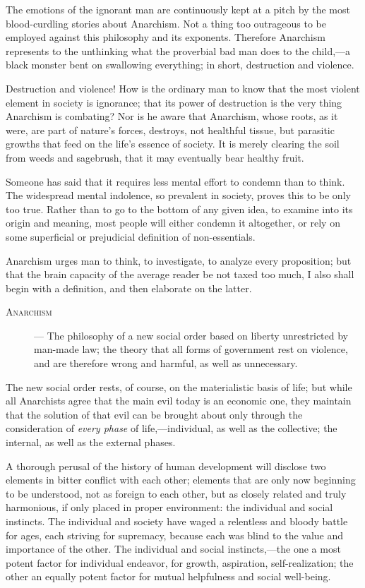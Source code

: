 The emotions of the ignorant man are continuously kept at a pitch by
the most blood-curdling stories about Anarchism. Not a thing too
outrageous to be employed against this philosophy and its exponents.
Therefore Anarchism represents to the unthinking what the proverbial
bad man does to the child,---a black monster bent on swallowing
everything; in short, destruction and violence.

Destruction and violence! How is the ordinary man to know that the
most violent element in society  is ignorance; that its power
of destruction is the very thing Anarchism is combating? Nor is he
aware that Anarchism, whose roots, as it were, are part of nature's
forces, destroys, not healthful tissue, but parasitic growths that
feed on the life's essence of society. It is merely clearing the soil
from weeds and sagebrush, that it may eventually bear healthy fruit.

Someone has said that it requires less mental effort to condemn than
to think. The widespread mental indolence, so prevalent in society,
proves this to be only too true. Rather than to go to the bottom of
any given idea, to examine into its origin and meaning, most people
will either condemn it altogether, or rely on some superficial or
prejudicial definition of non-essentials.

Anarchism urges man to think, to investigate, to analyze every
proposition; but that the brain capacity of the average reader be not
taxed too much, I also shall begin with a definition, and then
elaborate on the latter.

\begin{description}

\item[\textsc{Anarchism}]--- The philosophy of a new social order
based on liberty unrestricted by man-made law; the theory that all
forms of government rest on violence, and are therefore wrong and
harmful, as well as unnecessary.

\end{description}

The new social order rests, of course, on the materialistic basis of
life; but while all Anarchists agree that the main evil today is an
economic one, they maintain that the solution of that evil can be
brought about only through the consideration of \textit{every phase}
of life,---in\-di\-vid\-u\-al, as well as the collective; the
internal, as well as the external phases.

A thorough perusal of the history of human development will
disclose two elements in bitter conflict with each other; elements
that are only now beginning to be understood, not as foreign to each
other, but as closely related and truly harmonious, if only placed in
proper environment: the individual and social instincts. The
individual and society have waged a relentless and bloody battle for
ages, each striving for supremacy, because each was blind to the value
and importance of the other. The individual and social
instincts,---the one a most potent factor for individual endeavor, for
growth, aspiration, self-realization; the other an equally potent
factor for mutual helpfulness and social well-being.

